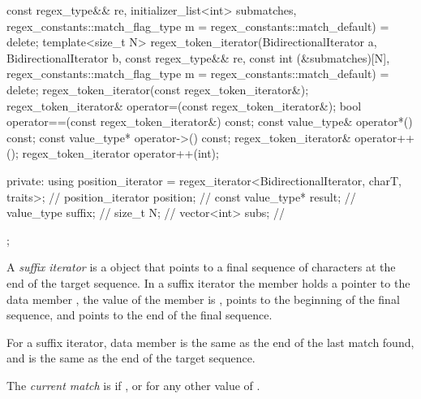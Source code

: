 \begin{codeblock}
{{                           const regex_type&& re,
                           initializer_list<int> submatches,
                           regex_constants::match_flag_type m =
                             regex_constants::match_default) = delete;
      template<size_t N>
      regex_token_iterator(BidirectionalIterator a, BidirectionalIterator b,
                           const regex_type&& re,
                           const int (&submatches)[N],
                           regex_constants::match_flag_type m =
                             regex_constants::match_default) = delete;
      regex_token_iterator(const regex_token_iterator&);
      regex_token_iterator& operator=(const regex_token_iterator&);
      bool operator==(const regex_token_iterator&) const;
      const value_type& operator*() const;
      const value_type* operator->() const;
      regex_token_iterator& operator++();
      regex_token_iterator operator++(int);

    private:
      using position_iterator =
        regex_iterator<BidirectionalIterator, charT, traits>;   // \expos
      position_iterator position;                               // \expos
      const value_type* result;                                 // \expos
      value_type suffix;                                        // \expos
      size_t N;                                                 // \expos
      vector<int> subs;                                         // \expos
    };
}
\end{codeblock}

\pnum
A \textit{suffix iterator} is a  object
that points to a final sequence of characters at
the end of the target sequence. In a suffix iterator the
member  holds a pointer to the data
member , the value of the member 
is ,  points to the beginning of the
final sequence, and  points to the end of the
final sequence.

\pnum
\begin{note}
For a suffix iterator, data
member  is the same as the end of the last match
found, and  is the same as the end of the target
sequence.
\end{note}

\pnum
The \textit{current match} is  if , or
 for any other value of .

